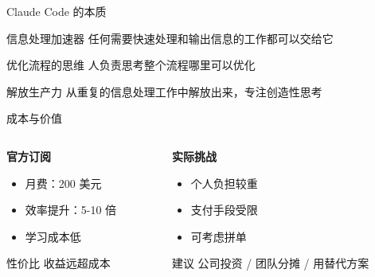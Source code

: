 \documentclass[aspectratio=169,xcolor=dvipsnames]{beamer}
\begin{document}
\begin{frame}{Claude Code 的本质}
  \begin{block}{信息处理加速器}
    任何需要快速处理和输出信息的工作都可以交给它
  \end{block}

  \vspace{0.3cm}

  \begin{exampleblock}{优化流程的思维}
    人负责思考整个流程哪里可以优化
  \end{exampleblock}

  \vspace{0.3cm}

  \begin{alertblock}{解放生产力}
    从重复的信息处理工作中解放出来，专注创造性思考
  \end{alertblock}
\end{frame}

\begin{frame}{成本与价值}
  \begin{columns}
    \begin{column}{0.48\textwidth}
      \textbf{官方订阅}
      \begin{itemize}
        \item 月费：200 美元
        \item 效率提升：5-10 倍
        \item 学习成本低
      \end{itemize}

      \vspace{0.3cm}

      \begin{alertblock}{性价比}
        收益远超成本
      \end{alertblock}
    \end{column}
    \begin{column}{0.48\textwidth}
      \textbf{实际挑战}
      \begin{itemize}
        \item 个人负担较重
        \item 支付手段受限
        \item 可考虑拼单
      \end{itemize}

      \vspace{0.3cm}

      \begin{exampleblock}{建议}
        公司投资 / 团队分摊 / 用替代方案
      \end{exampleblock}
    \end{column}
  \end{columns}
\end{frame}
\end{document}
